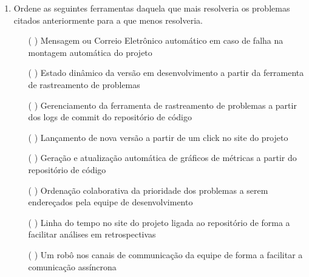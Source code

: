 \begin{enumerate}
\item Ordene as seguintes ferramentas daquela que mais resolveria os
  problemas citados anteriormente para a que menos resolveria.
  \begin{itemize}
  \item[( )] Mensagem ou Correio Eletrônico automático em caso de
    falha na montagem automática do projeto
  \item[( )] Estado dinâmico da versão em desenvolvimento a partir da
    ferramenta de rastreamento de problemas
  \item[( )] Gerenciamento da ferramenta de rastreamento de problemas
    a partir dos logs de commit do repositório de código
  \item[( )] Lançamento de nova versão a partir de um click no site do
    projeto
  \item[( )] Geração e atualização automática de gráficos de métricas
    a partir do repositório de código
  \item[( )] Ordenação colaborativa da prioridade dos problemas a
    serem endereçados pela equipe de desenvolvimento
  \item[( )] Linha do tempo no site do projeto ligada ao repositório
    de forma a facilitar análises em retrospectivas
  \item[( )] Um robô nos canais de communicação da equipe de forma a
    facilitar a comunicação assíncrona
  \end{itemize}
\end{enumerate}
